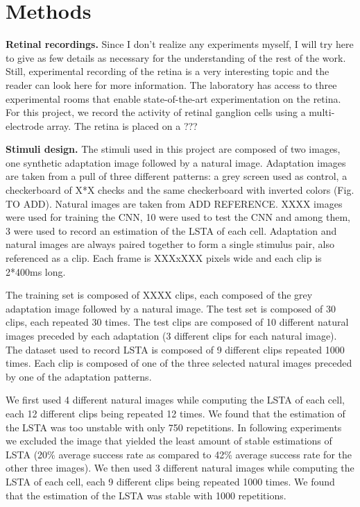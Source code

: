 \section{Methods}\label{sec:methods}

\textbf{Retinal recordings.}
Since I don't realize any experiments myself, I will try here to give as few
details
as necessary for the understanding of the rest of the work. Still, experimental
recording of the retina is a very interesting topic and the reader can look
here for more information. %
The laboratory has access to three experimental rooms that enable
state-of-the-art experimentation
on the retina.	For this project, we record the activity of retinal ganglion
cells
using a multi-electrode array. The retina is placed on a ???


\textbf{Stimuli design.}
The stimuli used in this project are composed of two images, one synthetic
adaptation image followed by a natural image. Adaptation images are taken from
a pull of three different patterns: a grey screen used as control, a
checkerboard of X*X checks and the same checkerboard with inverted colors (Fig.
TO ADD). Natural images are taken from ADD REFERENCE. XXXX images were used for
training the CNN, 10 were used to test the CNN and among them, 3 were used to
record an estimation of the LSTA of each cell.
Adaptation and natural images are always paired together to form a single
stimulus pair, also referenced as a clip. Each frame is XXXxXXX pixels wide and
each clip is 2*400ms long.


The training set is composed of XXXX clips, each composed of the grey
adaptation image followed by a natural image. The test set is composed of 30
clips, each repeated 30 times. The test clips are composed of 10 different
natural
images preceded by each adaptation (3 different clips for each natural image).
The dataset used to record LSTA is composed of 9 different clips repeated 1000
times. Each clip is composed of one of the three selected natural images
preceded by one of the adaptation patterns.

We first used 4 different natural images while computing the LSTA of each cell,
each 12 different clips being repeated 12 times. We found that the estimation
of the LSTA was too unstable with only 750 repetitions. In following
experiments we excluded the image that yielded the least amount of stable
estimations of LSTA (20\% average success rate as compared to 42\% average
success rate for the other three images). We then used 3 different natural
images while computing the LSTA of each cell, each 9 different clips being
repeated 1000 times. We found that the estimation of the LSTA was stable with
1000 repetitions.

